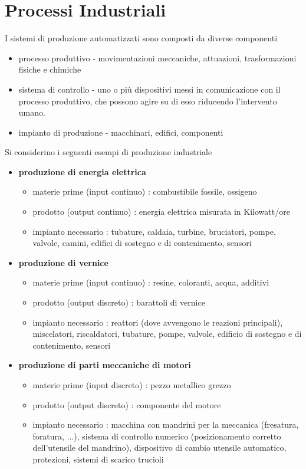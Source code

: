 \documentclass[10pt, letterpaper]{report}
\begin{document}
\section{Processi Industriali}
I sistemi di produzione automatizzati sono composti da 
diverse componenti\begin{itemize}
    \item processo produttivo - movimentazioni meccaniche, attuazioni, 
    trasformazioni fisiche e chimiche 
    \item sistema di controllo - uno o più dispositivi messi in comunicazione 
    con il processo produttivo, che possono agire su di esso riducendo 
    l'intervento umano. 
    \item impianto di produzione - macchinari, edifici, componenti
\end{itemize}
Si considerino i seguenti esempi di produzione industriale\begin{itemize}
    \item \textbf{produzione di energia elettrica} \begin{itemize}
        \item materie prime (input continuo) : combustibile fossile, ossigeno 
        \item prodotto (output continuo) : energia elettrica misurata in Kilowatt/ore
        \item impianto necessario : tubature, caldaia, turbine, bruciatori, pompe, valvole, camini, edifici di
        sostegno e di contenimento, sensori
        
    \end{itemize}
    \item \textbf{produzione di vernice} \begin{itemize}
        \item materie prime (input continuo) : resine, coloranti, acqua, additivi
        \item prodotto (output discreto) : barattoli di vernice
        \item impianto necessario : reattori (dove avvengono le reazioni principali), miscelatori, riscaldatori,
        tubature, pompe, valvole, edificio di sostegno e di contenimento, sensori
    \end{itemize}
    \item \textbf{produzione di parti meccaniche di motori} \begin{itemize}
        \item materie prime (input discreto) : pezzo metallico grezzo
        \item prodotto (output discreto) : componente del motore
        \item impianto necessario : macchina con mandrini per la meccanica (fresatura, foratura, ...), sistema di
        controllo numerico (posizionamento corretto dell’utensile del mandrino),
        dispositivo di cambio utensile automatico, protezioni, sistemi di scarico
        trucioli
    \end{itemize}
\end{itemize}
\end{document}
